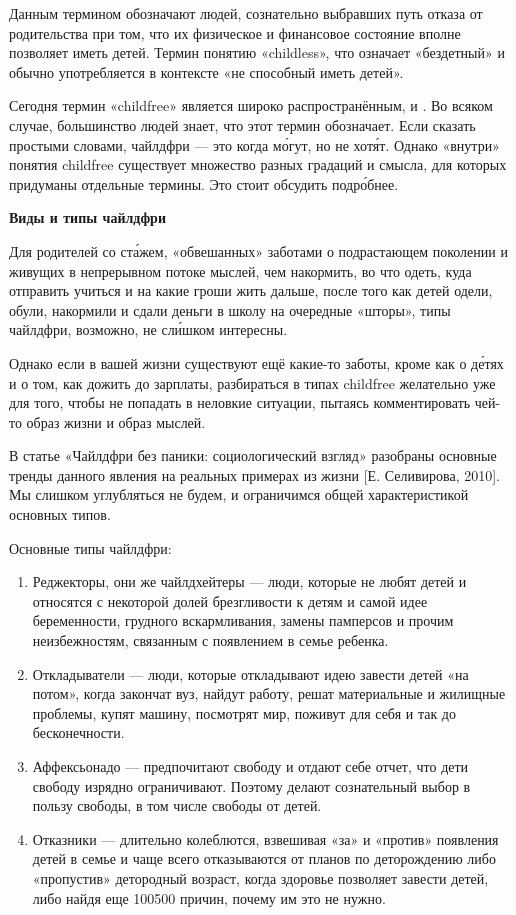 Данным термином обозначают людей, сознательно выбравших путь отказа от родительства при том, что их физическое и финансовое состояние вполне позволяет иметь детей. Термин   понятию «childless», что означает «бездетный» и обычно употребляется в контексте «не способный иметь детей».

Сегодня термин «childfree» является широко распространённым,  и . Во всяком случае, большинство людей знает, что этот термин обозначает. Если сказать простыми словами, чайлдфри --- это когда м\'{о}гут, но не хот\'{я}т. Однако «внутри» понятия childfree существует множество разных градаций и  смысла, для которых придуманы отдельные термины. Это стоит обсудить подр\'{о}бнее.

\textbf{Виды и типы чайлдфри}

Для родителей со ст\'{а}жем, «обвешанных» заботами о подрастающем поколении и живущих в непрерывном потоке мыслей, чем накормить, во что одеть, куда отправить учиться и на какие гроши жить дальше, после того как детей одели, обули, накормили и сдали деньги в школу на очередные «шторы», типы чайлдфри, возможно, не сл\'{и}шком интересны.

Однако если в вашей жизни существуют ещё какие-то заботы, кроме как о д\'{е}тях и о том, как дожить до зарплаты, разбираться в типах childfree желательно уже для того, чтобы не попадать в неловкие ситуации, пытаясь комментировать чей-то образ жизни и образ мыслей.

В статье «Чайлдфри без паники: социологический взгляд» разобраны основные тренды данного явления на реальных примерах из жизни [Е. Селивирова, 2010]. Мы слишком углубляться не будем, и ограничимся общей характеристикой основных типов.

Основные типы чайлдфри:
\begin{enumerate}
    \item Реджекторы, они же чайлдхейтеры --- люди, которые не любят детей и относятся с некоторой долей брезгливости к детям и самой идее беременности, грудного вскармливания, замены памперсов и прочим неизбежностям, связанным с появлением в семье ребенка.
    \item Откладыватели --- люди, которые откладывают идею завести детей «на потом», когда закончат вуз, найдут работу, решат материальные и жилищные проблемы, купят машину, посмотрят мир, поживут для себя и так до бесконечности.
    \item Аффексьонадо --- предпочитают свободу и отдают себе отчет, что дети свободу изрядно ограничивают. Поэтому делают сознательный выбор в пользу свободы, в том числе свободы от детей.
    \item Отказники --- длительно колеблются, взвешивая «за» и «против» появления детей в семье и чаще всего отказываются от планов по деторождению либо «пропустив» детородный возраст, когда здоровье позволяет завести детей, либо найдя еще 100500 причин, почему им это не нужно.
\end{enumerate}

